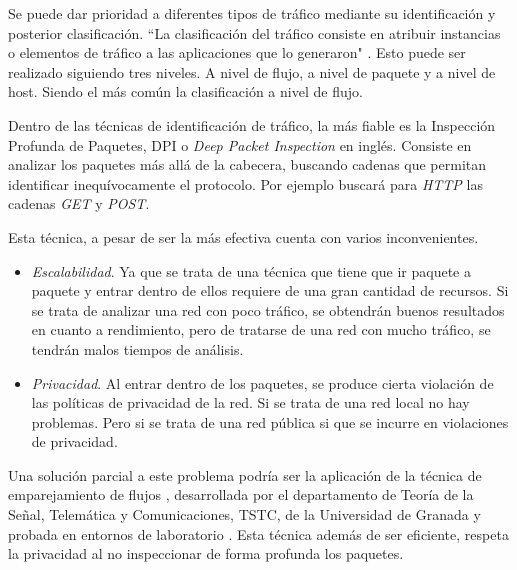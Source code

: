 \intro Se puede dar prioridad a diferentes tipos de tráfico mediante su identificación y posterior clasificación. ``La clasificación 
del tráfico consiste en atribuir instancias o elementos de tráfico a las aplicaciones que lo generaron" \cite{tesis2016}. Esto puede 
ser realizado siguiendo tres niveles. A nivel de flujo, a nivel de paquete y a nivel de host. Siendo el más común la clasificación 
a nivel de flujo.


\intro Dentro de las técnicas de identificación de tráfico, la más fiable es la Inspección Profunda de Paquetes, DPI o \textit{Deep Packet Inspection} en inglés\cite{dpiaproximacion}. Consiste en analizar los paquetes más allá de la cabecera, buscando cadenas que 
permitan identificar inequívocamente el protocolo. Por ejemplo buscará para \textit{HTTP} las cadenas \textit{GET} y \textit{POST}.

\intro Esta técnica, a pesar de ser la más efectiva cuenta con varios inconvenientes.
\begin{itemize}
\item \textit{Escalabilidad}. Ya que se trata de una técnica que tiene que ir paquete a paquete y entrar dentro de ellos requiere de 
una gran cantidad de recursos. Si se trata de analizar una red con poco tráfico, se obtendrán buenos resultados en cuanto a 
rendimiento, pero de tratarse de una red con mucho tráfico, se tendrán malos tiempos de análisis.
\item \textit{Privacidad}. Al entrar dentro de los paquetes, se produce cierta violación de las políticas de privacidad de la red. Si 
se trata de una red local no hay problemas. Pero si se trata de una red pública si que se incurre en violaciones de privacidad.
\end{itemize}

\intro Una solución parcial a este problema podría ser la aplicación de la técnica de emparejamiento de flujos \cite{presentacion}, 
desarrollada por el departamento de Teoría de la Señal, Telemática y Comunicaciones, TSTC, de la Universidad de Granada y probada en 
entornos de laboratorio \cite{comparacion}. Esta técnica además de ser eficiente, respeta la privacidad al no inspeccionar de forma 
profunda los paquetes.

